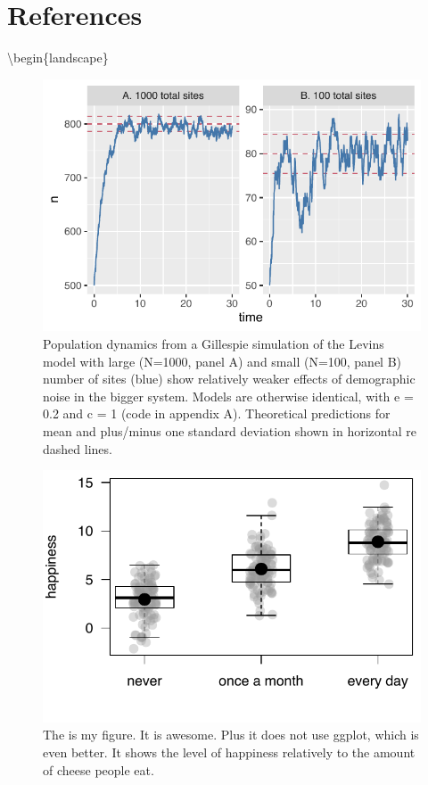 \documentclass[review]{elsarticle} %
\begin{document}
\hypertarget{references}{%
\section{References}\label{references}}

\newpage

\textbackslash{}begin\{landscape\}

\begin{figure}

{\centering \includegraphics[angle=0]{My_Ecology_Letters_article_files/figure-latex/figure1, figure1-1} 

}

\caption{\label{fig:figure1}Population dynamics from a Gillespie simulation of the Levins model with large (N=1000, panel A) and small (N=100, panel B) number of sites (blue) show relatively weaker effects of demographic noise in the bigger system. Models are otherwise identical, with e = 0.2 and c = 1 (code in appendix A). Theoretical predictions for mean and plus/minus one standard deviation shown in horizontal re dashed lines.}\label{fig:figure1, figure1}
\end{figure}

\begin{figure}
\centering
\includegraphics{My_Ecology_Letters_article_files/figure-latex/myfigure-1.pdf}
\caption{\label{fig:myfigure}The is my figure. It is awesome. Plus it
does not use ggplot, which is even better. It shows the level of
happiness relatively to the amount of cheese people eat.}
\end{figure}
\end{document}
